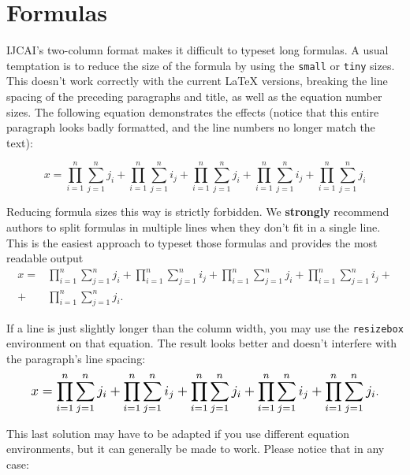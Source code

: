 \documentclass{article}
\begin{document}
\section{Formulas}

IJCAI's two-column format makes it difficult to typeset long formulas. A usual temptation is to reduce the size of the formula by using the {\tt small} or {\tt tiny} sizes. This doesn't work correctly with the current \LaTeX{} versions, breaking the line spacing of the preceding paragraphs and title, as well as the equation number sizes. The following equation demonstrates the effects (notice that this entire paragraph looks badly formatted, and the line numbers no longer match the text):
%
\begin{tiny}
    \begin{equation}
        x = \prod_{i=1}^n \sum_{j=1}^n j_i + \prod_{i=1}^n \sum_{j=1}^n i_j + \prod_{i=1}^n \sum_{j=1}^n j_i + \prod_{i=1}^n \sum_{j=1}^n i_j + \prod_{i=1}^n \sum_{j=1}^n j_i
    \end{equation}
\end{tiny}%

Reducing formula sizes this way is strictly forbidden. We {\bf strongly} recommend authors to split formulas in multiple lines when they don't fit in a single line. This is the easiest approach to typeset those formulas and provides the most readable output%
%
\begin{align}
    x = & \prod_{i=1}^n \sum_{j=1}^n j_i + \prod_{i=1}^n \sum_{j=1}^n i_j + \prod_{i=1}^n \sum_{j=1}^n j_i + \prod_{i=1}^n \sum_{j=1}^n i_j + \nonumber \\
    +   & \prod_{i=1}^n \sum_{j=1}^n j_i.
\end{align}%

If a line is just slightly longer than the column width, you may use the {\tt resizebox} environment on that equation. The result looks better and doesn't interfere with the paragraph's line spacing: %
\begin{equation}
    \resizebox{.91\linewidth}{!}{$
            \displaystyle
            x = \prod_{i=1}^n \sum_{j=1}^n j_i + \prod_{i=1}^n \sum_{j=1}^n i_j + \prod_{i=1}^n \sum_{j=1}^n j_i + \prod_{i=1}^n \sum_{j=1}^n i_j + \prod_{i=1}^n \sum_{j=1}^n j_i
        $}.
\end{equation}%

This last solution may have to be adapted if you use different equation environments, but it can generally be made to work. Please notice that in any case:
\end{document}
